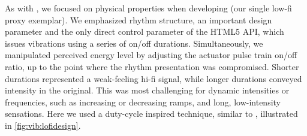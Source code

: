 As with \linear, we focused on physical properties when developing \lofi (our single low-fi proxy exemplar).
We emphasized rhythm structure, an important design parameter \cite{Ternes2008} and the only direct control parameter of the HTML5 API, which issues vibrations using a series of on/off durations.
Simultaneously, we manipulated perceived energy level by adjusting the actuator pulse train on/off ratio, up to the point where the rhythm presentation was compromised.
Shorter durations represented a weak-feeling hi-fi signal, while longer durations conveyed intensity in the original.
%
%    
%
This was most challenging for dynamic intensities or frequencies, such as increasing or decreasing ramps, and long, low-intensity sensations.
Here we used a duty-cycle inspired technique, similar to \cite{Israr2015}, illustrated in \autoref{fig:vib:lofidesign}.
%


